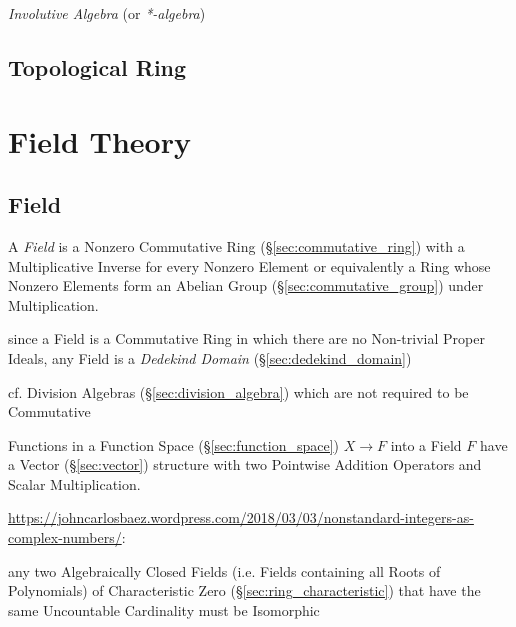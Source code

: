\emph{Involutive Algebra} (or \emph{*-algebra})



\subsection{Topological Ring}\label{sec:topological_ring}



\section{Field Theory}\label{sec:field_theory}

\subsection{Field}\label{sec:field}

A \emph{Field} is a Nonzero Commutative Ring
(\S\ref{sec:commutative_ring}) with a Multiplicative Inverse for every
Nonzero Element or equivalently a Ring whose Nonzero Elements form an
Abelian Group (\S\ref{sec:commutative_group}) under Multiplication.

since a Field is a Commutative Ring in which there are no Non-trivial Proper
Ideals, any Field is a \emph{Dedekind Domain} (\S\ref{sec:dedekind_domain})

cf. Division Algebras (\S\ref{sec:division_algebra}) which are not required to
be Commutative

Functions in a Function Space (\S\ref{sec:function_space}) $X
\rightarrow F$ into a Field $F$ have a Vector (\S\ref{sec:vector})
structure with two Pointwise Addition Operators and Scalar
Multiplication.

\url{https://johncarlosbaez.wordpress.com/2018/03/03/nonstandard-integers-as-complex-numbers/}:

any two Algebraically Closed Fields (i.e. Fields containing all Roots of
Polynomials) of Characteristic Zero (\S\ref{sec:ring_characteristic}) that have
the same Uncountable Cardinality must be Isomorphic

